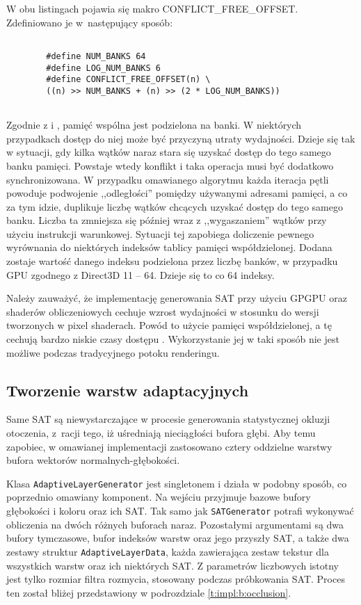 		W obu listingach pojawia się makro CONFLICT\_FREE\_OFFSET. Zdefiniowano je w~następujący sposób:
		
		\begin{lstlisting}[language=HLSL,caption={Makro CONFLICT\_FREE\_OFFSET.},label={lst_6_J}]
		
		#define NUM_BANKS 64
		#define LOG_NUM_BANKS 6
		#define CONFLICT_FREE_OFFSET(n) \
		((n) >> NUM_BANKS + (n) >> (2 * LOG_NUM_BANKS))
		
		\end{lstlisting}
		
		Zgodnie z \cite{sat} i \cite{directcompute}, pamięć wspólna jest podzielona na banki. W niektórych przypadkach dostęp do niej może być przyczyną utraty wydajności. Dzieje się tak w sytuacji, gdy kilka wątków naraz stara się uzyskać dostęp do tego samego banku pamięci. Powstaje wtedy konflikt i taka operacja musi być dodatkowo synchronizowana. W przypadku omawianego algorytmu każda iteracja pętli powoduje podwojenie ,,odległości'' pomiędzy używanymi adresami pamięci, a co za tym idzie, duplikuje liczbę wątków chcących uzyskać dostęp do tego samego banku. Liczba ta zmniejsza się później wraz z ,,wygaszaniem'' wątków przy użyciu instrukcji warunkowej. Sytuacji tej zapobiega doliczenie pewnego wyrównania do niektórych indeksów tablicy pamięci współdzielonej. Dodana zostaje wartość danego indeksu podzielona przez liczbę banków, w przypadku GPU zgodnego z Direct3D 11 -- 64. Dzieje się to co 64 indeksy.
		
		Należy zauważyć, że implementację generowania SAT przy użyciu GPGPU oraz shaderów obliczeniowych cechuje wzrost wydajności w stosunku do wersji tworzonych w pixel shaderach. Powód to użycie pamięci współdzielonej, a tę cechują bardzo niskie czasy dostępu \cite{sat}. Wykorzystanie jej w taki sposób nie jest możliwe podczas tradycyjnego potoku renderingu.
		
	\subsection{Tworzenie warstw adaptacyjnych}
	\label{t:impl:b:adaptive}
	
		Same SAT są niewystarczające w procesie generowania statystycznej okluzji otoczenia, z~racji tego, iż uśredniają nieciągłości bufora głębi. Aby temu zapobiec, w omawianej implementacji zastosowano cztery oddzielne warstwy bufora wektorów normalnych-głębokości. 
		
		Klasa \texttt{AdaptiveLayerGenerator} jest singletonem i działa w podobny sposób, co poprzednio omawiany komponent. Na wejściu przyjmuje bazowe bufory głębokości i koloru oraz ich SAT. Tak samo jak \texttt{SATGenerator} potrafi wykonywać obliczenia na dwóch różnych buforach naraz. Pozostałymi argumentami są dwa bufory tymczasowe, bufor indeksów warstw oraz jego przyszły SAT, a także dwa zestawy struktur \texttt{AdaptiveLayerData}, każda zawierająca zestaw tekstur dla wszystkich warstw oraz ich niektórych SAT. Z parametrów liczbowych istotny jest tylko rozmiar filtra rozmycia, stosowany podczas próbkowania SAT. Proces ten został bliżej przedstawiony w podrozdziale \ref{t:impl:b:occlusion}.
		
